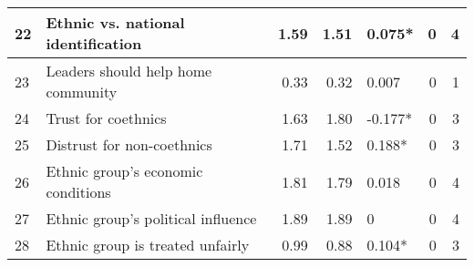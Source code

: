 \begin{tabular}{l|l|r|r|l|r|r}
\hline
\hline
22 & Ethnic vs. national identification & 1.59 & 1.51 & 0.075* & 0 & 4\\
\hline
23 & Leaders should help home community & 0.33 & 0.32 & 0.007 & 0 & 1\\
\hline
24 & Trust for coethnics & 1.63 & 1.80 & -0.177* & 0 & 3\\
\hline
25 & Distrust for non-coethnics & 1.71 & 1.52 & 0.188* & 0 & 3\\
\hline
26 & Ethnic group's economic conditions & 1.81 & 1.79 & 0.018 & 0 & 4\\
\hline
27 & Ethnic group's political influence & 1.89 & 1.89 & 0 & 0 & 4\\
\hline
28 & Ethnic group is treated unfairly & 0.99 & 0.88 & 0.104* & 0 & 3\\
\hline
\end{tabular}
\endgroup{}
